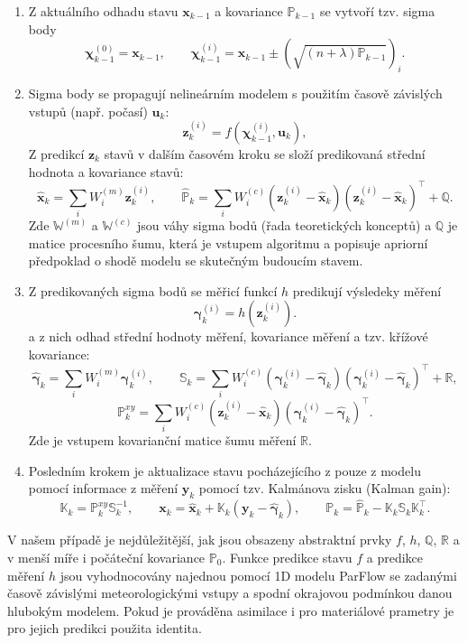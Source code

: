 \documentclass[11pt,a4paper]{article}
\def\tn#1{{\mathbb{#1}}}
\def\vc#1{\mathbf{\boldsymbol{#1}}}
\begin{document}
\begin{onehalfspacing}
\begin{enumerate}
  \setlength{\itemsep}{0pt}
  \setlength{\parskip}{0pt}
  \item Z aktuálního odhadu stavu $\vc x_{k-1}$ a kovariance $\tn P_{k-1}$ se
  vytvoří tzv. sigma body
  \[
    \vc\chi^{(0)}_{k-1}={\vc x}_{k-1},\qquad
    \vc\chi^{(i)}_{k-1}={\vc x}_{k-1}\pm
    \left(\sqrt{(n+\lambda)\tn P_{k-1}}\right)_i .
  \]
  \item Sigma body se propagují nelineárním modelem s použitím časově závislých vstupů (např. počasí) $\vc u_k$:
  \[
    \vc z^{(i)}_{k}=f\!\left(\vc\chi^{(i)}_{k-1},\vc u_k\right),
  \]
  Z predikcí $\vc z_k$ stavů v dalším časovém kroku se složí predikovaná střední hodnota a kovariance stavů:
  \[
    \hat{\vc x}_{k}=\sum_i W_i^{(m)}\vc z^{(i)}_{k},\qquad
    \hat{\tn P}_{k}=\sum_i W_i^{(c)}
    \left(\vc z^{(i)}_{k}-\hat{\vc x}_{k}\right)
    \left(\vc z^{(i)}_{k}-\hat{\vc x}_{k}\right)^\top+\tn Q.
  \]
  Zde $\tn W^(m)$ a $\tn W^(c)$ jsou váhy sigma bodů (řada teoretických konceptů) a $\tn Q$ je matice procesního šumu, která je vstupem algoritmu a popisuje apriorní předpoklad o shodě modelu se skutečným budoucím stavem.
  \item Z predikovaných sigma bodů se měřicí funkcí $h$ predikují výsledeky měření
  \[
    \vc\gamma^{(i)}_{k}=h\!\left(\vc z^{(i)}_{k}\right).
  \]
  a z nich odhad střední hodnoty měření, kovariance měření a tzv. křížové kovariance:
  \[
    \hat{\vc \gamma}_{k}=\sum_i W_i^{(m)}\vc\gamma^{(i)}_{k},\qquad
    \tn S_k=\sum_i W_i^{(c)}
    \left(\vc\gamma^{(i)}_{k}-\hat{\vc \gamma}_{k}\right)
    \left(\vc\gamma^{(i)}_{k}-\hat{\vc \gamma}_{k}\right)^\top+\tn R,
  \]
  \[
    \tn P^{xy}_k=\sum_i W_i^{(c)}
    \left(\vc z^{(i)}_{k}-\hat{\vc x}_{k}\right)
    \left(\vc\gamma^{(i)}_{k}-\hat{\vc \gamma}_{k}\right)^\top.
  \]
  Zde je vstupem kovarianční matice šumu měření $\tn R$.
  \item Posledním krokem je aktualizace stavu pocházejícího z pouze z modelu pomocí informace z měření $\vc y_k$ pomocí tzv. Kalmánova zisku (Kalman gain):
  \[
    \tn K_k=\tn P^{xy}_k \tn S_k^{-1},
    \qquad
    {\vc x}_{k}=\hat{\vc x}_{k}+\tn K_k\left(\vc y_k-\hat{\vc \gamma}_{k}\right),
    \qquad
    \tn P_k=\hat{\tn P}_{k}-\tn K_k \tn S_k \tn K_k^\top.
  \]
\end{enumerate}

V našem případě je nejdůležitější, jak jsou obsazeny abstraktní prvky
$f$, $h$, $\tn Q$, $\tn R$ a v menší míře i počáteční kovariance $\tn P_0$. Funkce
predikce stavu $f$ a predikce měření $h$ jsou vyhodnocovány najednou pomocí 1D modelu
ParFlow se zadanými časově závislými meteorologickými vstupy a spodní okrajovou podmínkou danou hlubokým modelem. Pokud je prováděna asimilace i pro materiálové prametry je pro jejich predikci použita identita.


\end{onehalfspacing}
\end{document}
